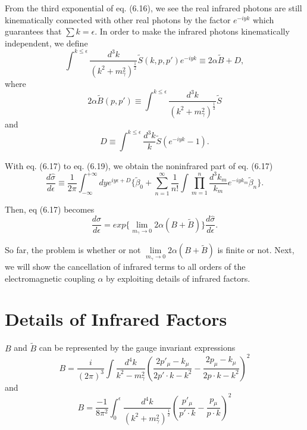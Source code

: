 From the third exponential of eq. (6.16), we see the real infrared photons are still kinematically connected with other real photons by the factor $e^{-iyk}$ which guarantees that $\sum k = \epsilon$. In order to make the infrared photons kinematically independent, we define
\begin{equation}
\int^{k\leq\epsilon}\frac{d^3k}{(k^2 + m_\gamma^2)^{\frac{1}{2}}}\tilde{S}(k,p,p')e^{-iyk} \equiv 2\alpha \tilde{B} + D,
\end{equation}
where
\begin{equation}
2\alpha\tilde{B}(p,p') \equiv \int^{k\leq\epsilon}\frac{d^3k}{(k^2 + m_\gamma^2)^{\frac{1}{2}}}\tilde{S}
\end{equation}
and
\begin{equation}
D \equiv \int^{k \leq \epsilon}\frac{d^3 k}{k}\tilde{S}(e^{-iyk} - 1).
\end{equation}

With eq. (6.17) to eq. (6.19), we obtain the noninfrared part of eq. (6.17)
\begin{equation}
\frac{d\hat{\sigma}}{d\epsilon} \equiv \frac{1}{2\pi}\int_{-\infty}^{+\infty}dy e^{iy\epsilon + D}\Bigg\{ \tilde{\beta}_0 + \sum_{n = 1}^{\infty}\frac{1}{n!}\int\prod_{m=1}^n \frac{d^3 k_m}{k_m}e^{-iyk_m}\tilde{\beta}_n\Bigg\}.
\end{equation}

Then, eq (6.17) becomes
\begin{equation}
\frac{d\sigma}{d\epsilon} = exp\Biggl\{ \lim_{m_\gamma\to 0} 2\alpha(B + \tilde{B}) \Biggr\}\frac{d\hat{\sigma}}{d\epsilon}.
\end{equation}

So far, the problem is whether or not $\lim\limits_{m_\gamma \to 0}2\alpha(B + \tilde{B})$ is finite
or not. Next, we will show the cancellation of infrared terms to all orders of the electromagnetic coupling $\alpha$ by exploiting details of infrared factors. 
\newpage
\section{Details of Infrared Factors}

$B$ and $\tilde{B}$ can be represented by the gauge invariant expressions \cite{YS}
\begin{equation}
B=\frac{i}{(2\pi)^3}\int\frac{d^4 k}{k^2 - m_\gamma^2}\left( \frac{2p'_\mu - k_\mu}{2p'\cdot k - k^2} - \frac{2p_\mu - k_\mu}{2p\cdot k - k^2}\right)^2
\end{equation}
and
\begin{equation}
B=\frac{-1}{8\pi^2}\int_0^{\epsilon}\frac{d^4 k}{(k^2 + m_\gamma^2)^{\frac{1}{2}}}\left( \frac{p'_\mu}{p'\cdot k} - \frac{p_\mu}{p\cdot k}\right)^2
\end{equation}

